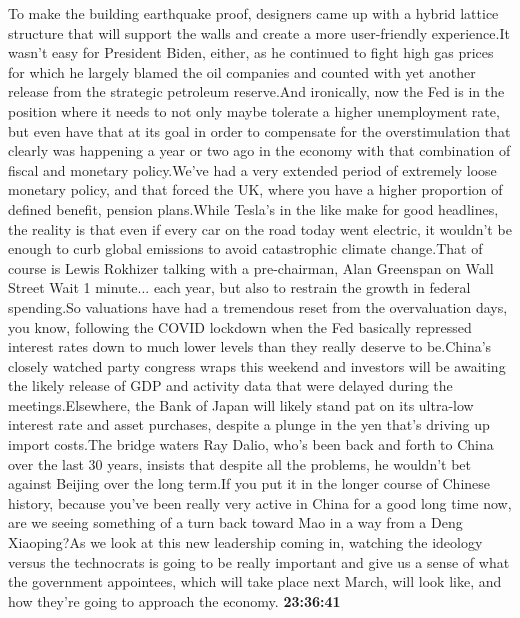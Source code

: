 \documentclass{article}%
\begin{document}
To make the building earthquake proof, designers came up with a hybrid lattice structure that will support the walls and create a more user{-}friendly experience.It wasn't easy for President Biden, either, as he continued to fight high gas prices for which he largely blamed the oil companies and counted with yet another release from the strategic petroleum reserve.And ironically, now the Fed is in the position where it needs to not only maybe tolerate a higher unemployment rate, but even have that at its goal in order to compensate for the overstimulation that clearly was happening a year or two ago in the economy with that combination of fiscal and monetary policy.We've had a very extended period of extremely loose monetary policy, and that forced the UK, where you have a higher proportion of defined benefit, pension plans.While Tesla's in the like make for good headlines, the reality is that even if every car on the road today went electric, it wouldn't be enough to curb global emissions to avoid catastrophic climate change.That of course is Lewis Rokhizer talking with a pre{-}chairman, Alan Greenspan on Wall Street Wait 1 minute...  each year, but also to restrain the growth in federal spending.So valuations have had a tremendous reset from the overvaluation days, you know, following the COVID lockdown when the Fed basically repressed interest rates down to much lower levels than they really deserve to be.China's closely watched party congress wraps this weekend and investors will be awaiting the likely release of GDP and activity data that were delayed during the meetings.Elsewhere, the Bank of Japan will likely stand pat on its ultra{-}low interest rate and asset purchases, despite a plunge in the yen that's driving up import costs.The bridge waters Ray Dalio, who's been back and forth to China over the last 30 years, insists that despite all the problems, he wouldn't bet against Beijing over the long term.If you put it in the longer course of Chinese history, because you've been really very active in China for a good long time now, are we seeing something of a turn back toward Mao in a way from a Deng Xiaoping?As we look at this new leadership coming in, watching the ideology versus the technocrats is going to be really important and give us a sense of what the government appointees, which will take place next March, will look like, and how they're going to approach the economy.%
\textbf{23:36:41}%
\newline%
\end{document}
